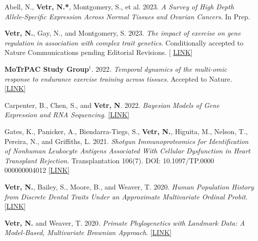 \documentclass[12pt]{article}
\begin{document}
\begin{enumerate}[label={[\arabic*]}]



\item Abell, N., \textbf{Vetr, N.*},  Montgomery, S., et al.  2023.  \emph{A Survey of High Depth Allele-Specific Expression Across Normal Tissues and Ovarian Cancers}.  In Prep.

\item \textbf{Vetr, N.},  Gay,  N.,  and Montgomery,  S.  2023.  \emph{The impact of exercise on gene regulation in association with complex trait genetics}.  Conditionally accepted to Nature Communications pending Editorial Revisions. [ \href{https://github.com/NikVetr/MoTrPAC_Complex_Traits}{LINK}]

\item \textbf{MoTrPAC Study Group}$^{\dag}$. 2022.  \emph{Temporal dynamics of the multi-omic response to endurance exercise training across tissues}.  Accepted to Nature.  [\href{https://www.biorxiv.org/content/10.1101/2022.09.21.508770v2}{LINK}]

\item  Carpenter,  B.,  Chen,  S.,  and \textbf{Vetr,  N}.  2022.  \emph{Bayesian Models of Gene Expression and RNA Sequencing}.  \href{https://github.com/bob-carpenter/BayesExpress/blob/main/latex/bayes-express/bayes-express.tex}{[LINK]}

\item Gates, K., Panicker, A., Biendarra-Tiegs, S., \textbf{Vetr, N.}, Higuita, M., Nelson, T., Pereira, N., and Griffiths, L. 2021.  \emph{Shotgun Immunoproteomics for Identification of Nonhuman Leukocyte Antigens Associated With Cellular Dysfunction in Heart Transplant Rejection}. Transplantation 106(7). DOI: 10.1097/TP.0000\\000000004012 [\href{https://pubmed.ncbi.nlm.nih.gov/34923540/}{LINK}]

\item \textbf{Vetr, N.}, Bailey, S., Moore, B., and Weaver, T. 2020.  \emph{Human Population History from Discrete Dental Traits Under an Approximate Multivariate Ordinal Probit}. [\href{https://github.com/NikVetr/papers/blob/main/plosone-manuscript/mvBM_manuscript_plosone.pdf}{LINK}]

\item \textbf{Vetr, N.} and Weaver, T. 2020.  \emph{Primate Phylogenetics with Landmark Data: A Model-Based, Multivariate Brownian Approach}. [\href{https://github.com/NikVetr/papers/blob/main/jhe-manuscript/mvBM_manuscript_JHE.pdf}{LINK}]


\end{enumerate}
\end{document}
